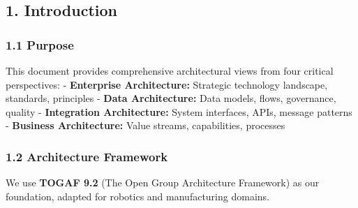 \documentclass[
]{article}
\begin{document}
\hypertarget{introduction}{%
\subsection{1. Introduction}\label{introduction}}

\hypertarget{purpose}{%
\subsubsection{1.1 Purpose}\label{purpose}}

This document provides comprehensive architectural views from four
critical perspectives: - \textbf{Enterprise Architecture:} Strategic
technology landscape, standards, principles - \textbf{Data
Architecture:} Data models, flows, governance, quality -
\textbf{Integration Architecture:} System interfaces, APIs, message
patterns - \textbf{Business Architecture:} Value streams, capabilities,
processes

\hypertarget{architecture-framework}{%
\subsubsection{1.2 Architecture
Framework}\label{architecture-framework}}

We use \textbf{TOGAF 9.2} (The Open Group Architecture Framework) as our
foundation, adapted for robotics and manufacturing domains.
\end{document}
